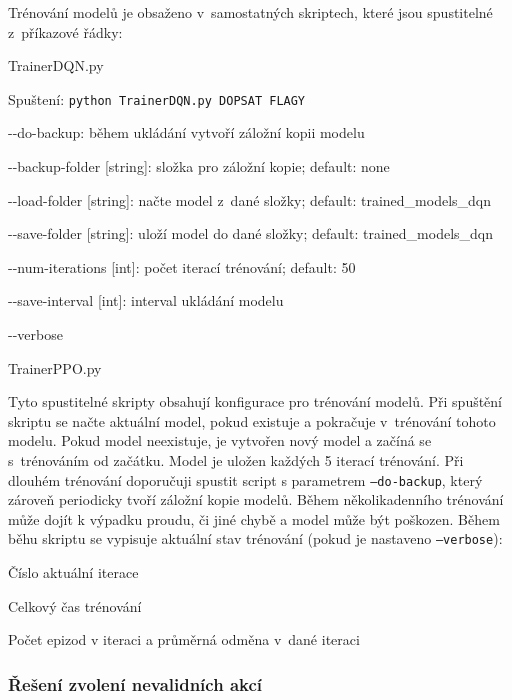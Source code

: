 Trénování modelů je obsaženo v~samostatných skriptech, které jsou spustitelné z~příkazové řádky:
\begin{myitemize}
  \item TrainerDQN.py
  \item Spuštení: \texttt{python TrainerDQN.py {\color{red}DOPSAT FLAGY}}
  \begin{myitemize}[${}$]
    \item -{}-do-backup: během ukládání vytvoří záložní kopii modelu
    \item -{}-backup-folder [string]: složka pro záložní kopie; default: none
    \item -{}-load-folder [string]: načte model z~dané složky; default: trained\_models\_dqn
    \item -{}-save-folder [string]: uloží model do dané složky; default: trained\_models\_dqn
    \item -{}-num-iterations [int]: počet iterací trénování; default: 50
    \item -{}-save-interval [int]: interval ukládání modelu
    \item -{}-verbose
  \end{myitemize}
  \item TrainerPPO.py
\end{myitemize}

Tyto spustitelné skripty obsahují konfigurace pro trénování modelů.
Při spuštění skriptu se načte aktuální model, pokud existuje a pokračuje v~trénování tohoto modelu.
Pokud model neexistuje, je vytvořen nový model a začíná se s~trénováním od začátku.
Model je uložen každých 5 iterací trénování.
Při dlouhém trénování doporučuji spustit script s parametrem \texttt{--do-backup}, který zároveň periodicky tvoří záložní kopie modelů.
Během několikadenního trénování může dojít k výpadku proudu, či jiné chybě a model může být poškozen.
Během běhu skriptu se vypisuje aktuální stav trénování (pokud je nastaveno \texttt{--verbose}):
\begin{myitemize}
  \item Číslo aktuální iterace
  \item Celkový čas trénování
  \item Počet epizod v iteraci a průměrná odměna v~dané iteraci
\end{myitemize}

\subsubsection*{Řešení zvolení nevalidních akcí}

